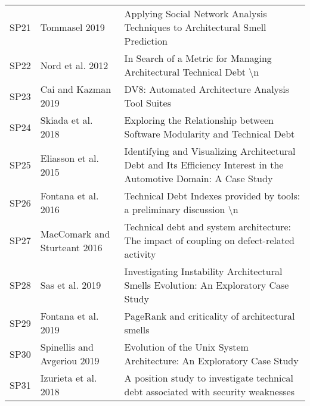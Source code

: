 \begin{tabular}{lll}
 SP21 &                   Tommasel 2019 &                                                                                             Applying Social Network Analysis Techniques to Architectural Smell Prediction  \\
 SP22 &                Nord et al. 2012 &                                                                                                         In Search of a Metric for Managing Architectural Technical Debt \textbackslash n \\
 SP23 &             Cai and Kazman 2019 &                                                                                                                          DV8: Automated Architecture Analysis Tool Suites  \\
 SP24 &              Skiada et al. 2018 &                                                                                                 Exploring the Relationship between Software Modularity and Technical Debt  \\
 SP25 &            Eliasson et al. 2015 &                                                          Identifying and Visualizing Architectural Debt and Its Efficiency Interest in the Automotive Domain: A Case Study \\
 SP26 &             Fontana et al. 2016 &                                                                                                      Technical Debt Indexes provided by tools: a preliminary discussion \textbackslash n \\
 SP27 &    MacComark and Sturteant 2016 &                                                                                 Technical debt and system architecture: The impact of coupling on defect-related activity  \\
 SP28 &                 Sas et al. 2019 &                                                                                        Investigating Instability Architectural Smells Evolution: An Exploratory Case Study \\
 SP29 &             Fontana et al. 2019 &                                                                                                                           PageRank and criticality of architectural smells \\
 SP30 &     Spinellis and Avgeriou 2019 &                                                                                                     Evolution of the Unix System Architecture: An Exploratory Case Study   \\
 SP31 &            Izurieta et al. 2018 &                                                                                         A position study to investigate technical debt associated with security weaknesses \\

\end{tabular}
